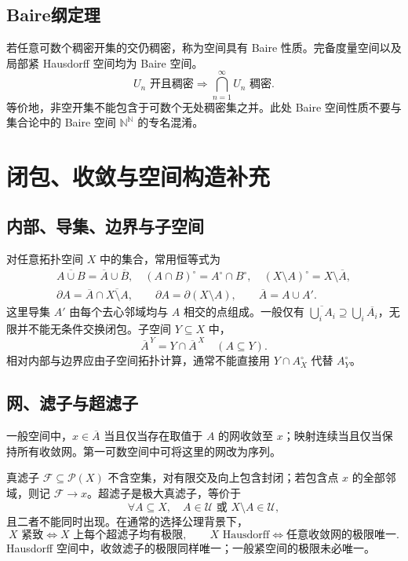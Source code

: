 \documentclass[../main.tex]{subfiles}
\begin{document}
\subsection{Baire纲定理}
若任意可数个稠密开集的交仍稠密，称为空间具有 Baire 性质。完备度量空间以及局部紧 Hausdorff 空间均为 Baire 空间。
\[
U_n\text{ 开且稠密}\Longrightarrow\bigcap_{n=1}^\infty U_n\text{ 稠密}.
\]
等价地，非空开集不能包含于可数个无处稠密集之并。此处 Baire 空间性质不要与集合论中的 Baire 空间 $\mathbb N^{\mathbb N}$ 的专名混淆。
\section{闭包、收敛与空间构造补充}
\subsection{内部、导集、边界与子空间}
对任意拓扑空间 $X$ 中的集合，常用恒等式为
\begin{gather*}
\overline{A\cup B}=\overline A\cup\overline B,\quad
(A\cap B)^\circ=A^\circ\cap B^\circ,\quad
(X\setminus A)^\circ=X\setminus\overline A,\\
\partial A=\overline A\cap\overline{X\setminus A},\qquad
\partial A=\partial(X\setminus A),\qquad
\overline A=A\cup A'.
\end{gather*}
这里导集 $A'$ 由每个去心邻域均与 $A$ 相交的点组成。一般仅有 $\overline{\bigcup_iA_i}\supseteq\bigcup_i\overline{A_i}$，无限并不能无条件交换闭包。子空间 $Y\subseteq X$ 中，
\[
\overline A^{\,Y}=Y\cap\overline A^{\,X}\quad(A\subseteq Y).
\]
相对内部与边界应由子空间拓扑计算，通常不能直接用 $Y\cap A_X^\circ$ 代替 $A_Y^\circ$。

\subsection{网、滤子与超滤子}
一般空间中，$x\in\overline A$ 当且仅当存在取值于 $A$ 的网收敛至 $x$；映射连续当且仅当保持所有收敛网。第一可数空间中可将这里的网改为序列。

真滤子 $\mathcal F\subseteq\mathcal P(X)$ 不含空集，对有限交及向上包含封闭；若包含点 $x$ 的全部邻域，则记 $\mathcal F\to x$。超滤子是极大真滤子，等价于
\[
\forall A\subseteq X,\quad A\in\mathcal U\text{ 或 }X\setminus A\in\mathcal U,
\]
且二者不能同时出现。在通常的选择公理背景下，
\[
X\text{ 紧致}\iff X\text{ 上每个超滤子均有极限},\qquad
X\text{ Hausdorff}\iff\text{任意收敛网的极限唯一}.
\]
Hausdorff 空间中，收敛滤子的极限同样唯一；一般紧空间的极限未必唯一。
\end{document}
